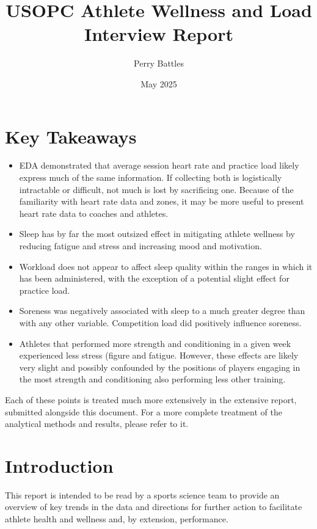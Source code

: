 \documentclass{article}
\title{USOPC Athlete Wellness and Load Interview Report}
\author{Perry Battles}
\date{May 2025}
\begin{document}
	\maketitle


	\section{Key Takeaways}

		\begin{itemize}
			\item EDA demonstrated that average session heart rate and
			practice load likely express much of the same information.
			If collecting both is logistically intractable or difficult,
			not much is lost by sacrificing one. Because of the familiarity
			with heart rate data and zones, it may be more useful to present
			heart rate data to coaches and athletes.
			\item Sleep has by far the most outsized effect in mitigating
			athlete wellness by reducing fatigue and stress and increasing
			mood and motivation.
			\item Workload does not appear to affect sleep quality within
			the ranges in which it has been administered,
			with the exception of a potential
			slight effect for practice load.
			\item Soreness was negatively associated with sleep to a much
			greater degree than with any other variable.
			Competition load did positively influence soreness.
			\item Athletes that performed more strength and conditioning
			in a given week experienced less stress (figure
			and fatigue.
			However, these effects are likely very slight and possibly
			confounded by the positions of players engaging in the most
			strength and conditioning also performing less other training.
		\end{itemize}

		Each of these points is treated much more extensively in the
		extensive report, submitted alongside this document. For a
		more complete treatment of the analytical methods and results,
		please refer to it.

	\section{Introduction}

		This report is intended to be read by a sports science team to provide
		an overview of key trends in the data and directions for further action
		to facilitate athlete health and wellness and, by extension, performance.
\end{document}
